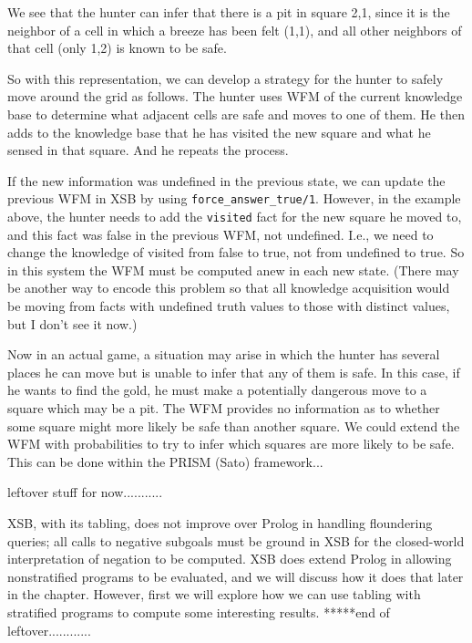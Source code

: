 We see that the hunter can infer that there is a pit in square 2,1,
since it is the neighbor of a cell in which a breeze has been felt
(1,1), and all other neighbors of that cell (only 1,2) is known to be
safe.

So with this representation, we can develop a strategy for the hunter
to safely move around the grid as follows.  The hunter uses WFM of the
current knowledge base to determine what adjacent cells are safe and
moves to one of them.  He then adds to the knowledge base that he has
visited the new square and what he sensed in that square.  And he
repeats the process.

If the new information was undefined in the previous state, we can
update the previous WFM in XSB by using \verb|force_answer_true/1|.
However, in the example above, the hunter needs to add the
\verb|visited| fact for the new square he moved to, and this fact was
false in the previous WFM, not undefined.  I.e., we need to change the
knowledge of visited from false to true, not from undefined to true.
So in this system the WFM must be computed anew in each new state.
(There may be another way to encode this problem so that all knowledge
acquisition would be moving from facts with undefined truth values to
those with distinct values, but I don't see it now.)

Now in an actual game, a situation may arise in which the hunter has
several places he can move but is unable to infer that any of them is
safe.  In this case, if he wants to find the gold, he must make a
potentially dangerous move to a square which may be a pit.  The WFM
provides no information as to whether some square might more likely be
safe than another square.  We could extend the WFM with probabilities
to try to infer which squares are more likely to be safe.  This can be
done within the PRISM (Sato) framework...


leftover stuff for now...........




XSB, with its tabling, does not improve over Prolog in handling
floundering queries; all calls to negative subgoals must be ground in
XSB for the closed-world interpretation of negation to be computed.
XSB does extend Prolog in allowing nonstratified programs to be
evaluated, and we will discuss how it does that later in the chapter.
However, first we will explore how we can use tabling with stratified
programs to compute some interesting results.
*****end of leftover............

